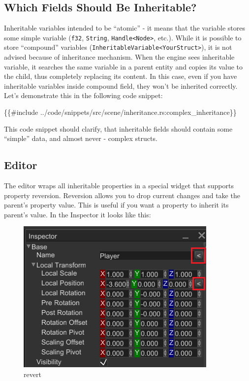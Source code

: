 \documentclass[
]{book}
\newenvironment{Shaded}{\begin{snugshade}}{\end{snugshade}}
\newcommand{\NormalTok}[1]{#1}
\theoremstyle{definition}
\theoremstyle{definition}
\theoremstyle{definition}
\theoremstyle{definition}
\theoremstyle{remark}
\begin{document}
\subsection{Which Fields Should Be Inheritable?}\label{which-fields-should-be-inheritable}

Inheritable variables intended to be ``atomic'' - it means that the variable stores some simple variable (\texttt{f32}, \texttt{String}, \texttt{Handle\textless{}Node\textgreater{}}, etc.). While it is possible to store ``compound'' variables (\texttt{InheritableVariable\textless{}YourStruct\textgreater{}}), it is not advised because of inheritance mechanism. When the engine sees inheritable variable, it searches the same variable in a parent entity and copies its value to the child, thus completely replacing its content. In this case, even if you have inheritable variables inside compound field, they won't be inherited correctly. Let's demonstrate this in the following code snippet:

\begin{Shaded}
\begin{Highlighting}[]
\NormalTok{\{\{\#include ../code/snippets/src/scene/inheritance.rs:complex\_inheritance\}\}}
\end{Highlighting}
\end{Shaded}

This code snippet should clarify, that inheritable fields should contain some ``simple'' data, and almost never - complex structs.

\subsection{Editor}\label{editor}

The editor wraps all inheritable properties in a special widget that supports property reversion. Reversion allows you to drop current changes and take the parent's property value. This is useful if you want a property to inherit its parent's value. In the Inspector it looks like this:

\begin{figure}
\centering
\includegraphics{images/scene_revert.png}
\caption{revert}
\end{figure}
\end{document}
